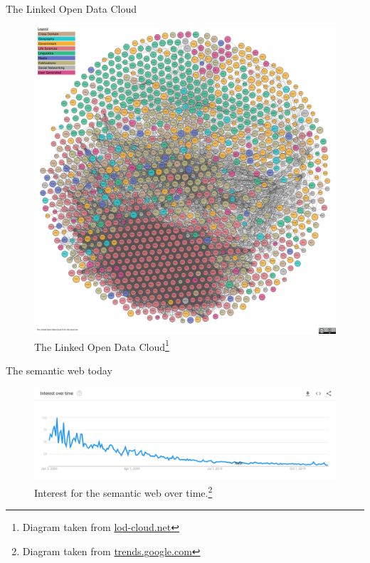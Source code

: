 \documentclass{beamer}
\begin{document}
	\begin{frame}{The Linked Open Data Cloud}
		\begin{figure}
			\includegraphics[scale=0.6]{resources/lod-cloud-sm.jpg}
			\caption{The Linked Open Data Cloud\footnote[frame]{%
				Diagram taken from \url{lod-cloud.net} }}
		\end{figure}
	\end{frame}

	\begin{frame}{The semantic web today}
		\begin{figure}
			\includegraphics[scale=0.25]{resources/semantic-web-is-dead.png}
			\caption{Interest for the semantic web over time.\footnote[frame]{%
				Diagram taken from \url{trends.google.com} }}
		\end{figure}
	\end{frame}
\end{document}
